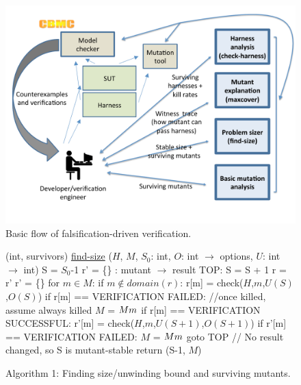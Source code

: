 \documentclass{svjour3}
\begin{document}
\begin{figure}
\includegraphics[width=\columnwidth]{TestFlow}
\caption{Basic flow of falsification-driven verification.}
\label{fig:flow}
\end{figure}

\begin{figure}
{\scriptsize 
\begin{code}
(int, survivors) {\underline{find-size}} ($H$, $M$, $S_0$: int,
                            $O$: int $\rightarrow$ options,
                            $U$: int $\rightarrow$ int) 
\vspace{0.1in}
  S = $S_0$-1 
  r' = \{\} : mutant $\rightarrow$ result
  TOP:
  S = S + 1 
  r = r' 
  r' = \{\}
  for $m \in M$:
     if $m \not\in domain(r)$:
         r[m] = check($H$,$m$,$U(S)$,$O(S)$) 
         if r[m] == VERIFICATION FAILED:
           //once killed, assume always killed 
           $M$ = $M \\ m$
     if r[m] == VERIFICATION SUCCESSFUL:
        r'[m] = check($H$,$m$,$U(S+1)$,$O(S+1)$) 
        if r'[m] == VERIFICATION FAILED:
           $M$ = $M \\ m$
           goto TOP 
  // No result changed, so S is mutant-stable 
  return (S-1, $M$) 
\end{code}
}
\caption{Algorithm 1: Finding size/unwinding bound and surviving
  mutants.}
\label{alg:unwind}
\end{figure}
\end{document}
